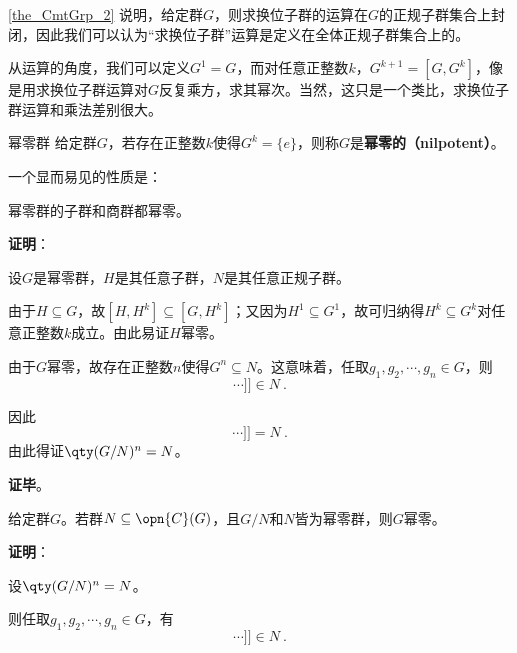 


\autoref{the_CmtGrp_2} 说明，给定群$G$，则求换位子群的运算在$G$的正规子群集合上封闭，因此我们可以认为“求换位子群”运算是定义在全体正规子群集合上的。

从运算的角度，我们可以定义$G^1=G$，而对任意正整数$k$，$G^{k+1}=[G, G^{k}]$，像是用求换位子群运算对$G$反复乘方，求其幂次。当然，这只是一个类比，求换位子群运算和乘法差别很大。


\begin{definition}{幂零群}
给定群$G$，若存在正整数$k$使得$G^k=\{e\}$，则称$G$是\textbf{幂零的（nilpotent）}。
\end{definition}

一个显而易见的性质是：


\begin{lemma}{}\label{lem_NipGrp_2}
幂零群的子群和商群都幂零。
\end{lemma}

\textbf{证明}：

设$G$是幂零群，$H$是其任意子群，$N$是其任意正规子群。

由于$H\subseteq G$，故$[H, H^{k}]\subseteq [G, H^{k}]$；又因为$H^1\subseteq G^1$，故可归纳得$H^k\subseteq G^k$对任意正整数$k$成立。由此易证$H$幂零。

由于$G$幂零，故存在正整数$n$使得$G^n\subseteq N$。这意味着，任取$g_1, g_2, \cdots, g_n\in G$，则
\begin{equation}
[g_1, [g_2\cdots[g_{n-1}, g_n]\cdots]] \in N~. 
\end{equation}

因此
\begin{equation}
[g_1N, [g_2N\cdots[g_{n-1}N, g_nN]\cdots]] = N~. 
\end{equation}
由此得证$\qty(G/N)^n=N$。

\textbf{证毕}。



\begin{lemma}{}\label{lem_NipGrp_1}
给定群$G$。若群$N\subseteq \opn{C}(G)$，且$G/N$和$N$皆为幂零群，则$G$幂零。
\end{lemma}


\textbf{证明}：

设$\qty(G/N)^n=N$。

则任取$g_1, g_2, \cdots, g_n\in G$，有
\begin{equation}
[g_1, [g_2\cdots[g_{n-1}, g_n]\cdots]] \in N~. 
\end{equation}

